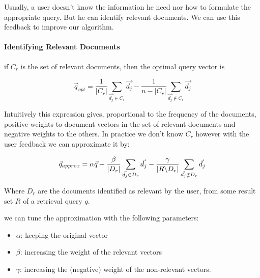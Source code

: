 Usually, a user doesn't know the information he need nor how to formulate the appropriate query. But he can identify relevant documents. We can use this feedback to improve our algorithm.
\paragraph{Identifying Relevant Documents}
if $C_r$ is the set of relevant documents, then the optimal query vector is 

\[ \vec{q}_{opt} = \frac{1}{|C_r|} \sum_{\vec{d_j} \in C_r} \vec{d_j} - \frac{1}{n-|C_r|} \sum_{\vec{d_j} \not \in C_r} \vec{d_j} \]

Intuitively this expression gives, proportional to the frequency of the documents, positive weights to document vectors in the set of relevant documents and negative weights to the others. In practice we don't know $C_r$ however with the user feedback we can approximate it by:

\[ \vec{q}_{approx} = \alpha\vec{q} + \frac{\beta}{|D_r|}\sum_{\vec{d_j} \in D_r} \vec{d_j} - \frac{\gamma}{\abs{R\symbol{92}D_r}} \sum_{\vec{d_j} \notin D_r} \vec{d_j} \]

Where $D_r$ are the documents identified as relevant by the user, from some result set $R$ of a retrieval query $q$.

we can tune the approximation with the following parameters:
\begin{itemize}
\item $\alpha$: keeping the original vector
\item $\beta$: increasing the weight of the relevant vectors
\item $\gamma$: increasing the (negative) weight of the non-relevant vectors.
\end{itemize}

\afterpage{\null\newpage}
